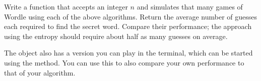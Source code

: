 \begin{problem}
	Write a function that accepts an integer \(n\) and simulates that many games of Wordle using each of the above algorithms.
	Return the average number of guesses each required to find the secret word.
	Compare their performance; the approach using the entropy should require about half as many guesses on average.
\end{problem}

The  object also has a version you can play in the terminal, which can be started using the  method.
You can use this to also compare your own performance to that of your algorithm.

